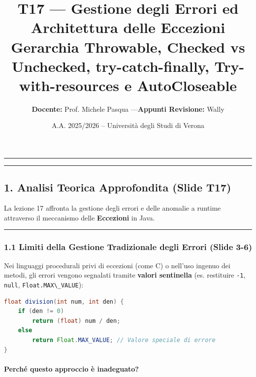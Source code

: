 \documentclass[11pt,a4paper]{article}
\title{\Huge\bfseries\sffamily\color{brandblue} T17 --- Gestione degli Errori ed Architettura delle Eccezioni \\[0.3em] \large\sffamily Gerarchia Throwable, Checked vs Unchecked, try-catch-finally, Try-with-resources e AutoCloseable}
\author{\textbf{Docente:} Prof. Michele Pasqua \quad---\quad \textbf{Appunti Revisione:} Wally}
\date{A.A. 2025/2026 -- Universit\`a degli Studi di Verona}
\newcommand{\passthrough}[1]{#1}
\begin{document}
\maketitle
\thispagestyle{fancy}
\vspace{-1.2em}
\noindent\textcolor{brandblue}{\rule{\textwidth}{0.8pt}}
\vspace{1.2em}

\begin{center}\rule{0.5\linewidth}{0.5pt}\end{center}

\subsection{1. Analisi Teorica Approfondita (Slide
T17)}\label{analisi-teorica-approfondita-slide-t17}

La lezione 17 affronta la gestione degli errori e delle anomalie a
runtime attraverso il meccanismo delle \textbf{Eccezioni} in Java.

\begin{center}\rule{0.5\linewidth}{0.5pt}\end{center}

\subsubsection{1.1 Limiti della Gestione Tradizionale degli Errori
(Slide
3-6)}\label{limiti-della-gestione-tradizionale-degli-errori-slide-3-6}

Nei linguaggi procedurali privi di eccezioni (come C) o nell'uso ingenuo
dei metodi, gli errori vengono segnalati tramite \textbf{valori
sentinella} (es. restituire \passthrough{\lstinline!-1!},
\passthrough{\lstinline!null!},
\passthrough{\lstinline!Float.MAX\_VALUE!}):

\begin{lstlisting}[language=Java]
float division(int num, int den) {
    if (den != 0)
        return (float) num / den;
    else
        return Float.MAX_VALUE; // Valore speciale di errore
}
\end{lstlisting}

\paragraph{Perché questo approccio è
inadeguato?}\label{perchuxe9-questo-approccio-uxe8-inadeguato}
\end{document}

